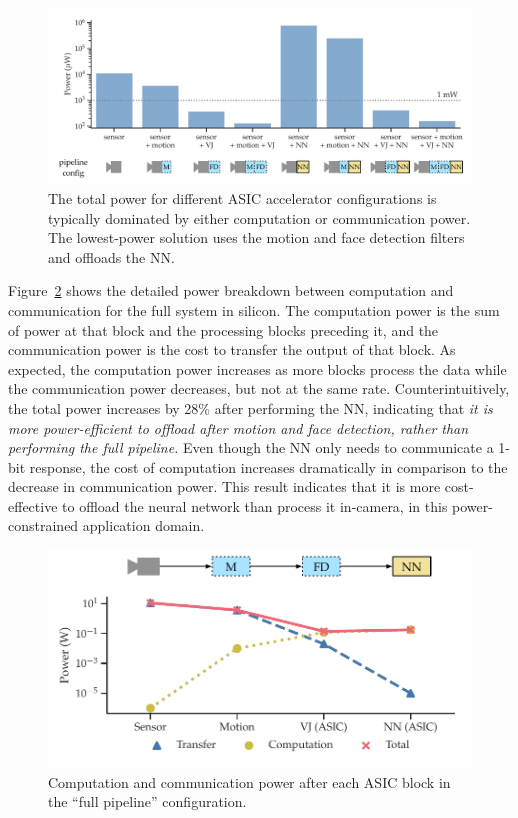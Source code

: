 \begin{figure}
\centering
    \begin{center}
      \includegraphics[width=\textwidth]{nsp-figs/FA_compute_comp_v5_2.pdf}
    \end{center}
    \caption{The total power for different ASIC accelerator configurations is typically dominated by either computation or communication power. The lowest-power solution uses the motion and face detection filters and offloads the NN. }
    \label{fig:all-face-auth-configs}
\end{figure}

Figure~\ref{fig:full-face-auth-pipeline} shows the detailed power breakdown between computation and communication for the full system in silicon. The computation power is the sum of power at that block and the processing blocks preceding it, and the communication power is the cost to transfer the output of that block. As expected, the computation power increases as more blocks process the data while the communication power decreases, but not at the same rate. Counterintuitively, the total power increases by 28\% after performing the NN, indicating that \textit{it is more power-efficient to offload after motion and face detection, rather than performing the full pipeline.} Even though the NN only needs to communicate a 1-bit response, the cost of computation increases dramatically in comparison to the decrease in communication power. This result indicates that it is more cost-effective to offload the neural network than process it in-camera, in this power-constrained application domain.

\begin{figure}
\centering
    \begin{center}
      \includegraphics[width=.7\textwidth]{nsp-figs/FA_compute_compress_4up_fig_2.pdf}
    \end{center}
    \caption{Computation and communication power after each ASIC block in the ``full pipeline'' configuration.}
    \label{fig:full-face-auth-pipeline}
\end{figure}

